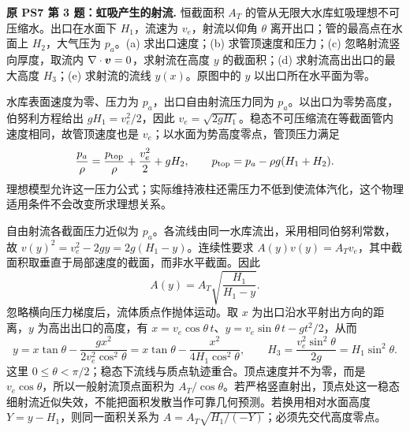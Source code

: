 \begin{example}
\textbf{原 PS7 第 3 题：虹吸产生的射流.} 
恒截面积 $A_T$ 的管从无限大水库虹吸理想不可压缩水。出口在水面下 $H_1$，流速为 $v_e$，射流以仰角 $\theta$ 离开出口；管的最高点在水面上 $H_2$，大气压为 $p_a$。(a) 求出口速度；(b) 求管顶速度和压力；(c) 忽略射流竖向厚度，取流内 $\nabla\cdot\boldsymbol{v}=0$，求射流在高度 $y$ 的截面积；(d) 求射流高出出口的最大高度 $H_3$；(e) 求射流的流线 $y(x)$。原图中的 $y$ 以出口所在水平面为零。
\end{example}
\begin{solution}
水库表面速度为零、压力为 $p_a$，出口自由射流压力同为 $p_a$。以出口为零势高度，伯努利方程给出 $gH_1=v_e^2/2$，因此 $v_e=\sqrt{2gH_1}$。稳态不可压缩流在等截面管内速度相同，故管顶速度也是 $v_e$；以水面为势高度零点，管顶压力满足
\[
 \frac{p_a}{\rho}=\frac{p_{\rm top}}{\rho}+\frac{v_e^2}{2}+gH_2,
 \qquad p_{\rm top}=p_a-\rho g(H_1+H_2).
\]
理想模型允许这一压力公式；实际维持液柱还需压力不低到使流体汽化，这个物理适用条件不会改变所求理想关系。

自由射流各截面压力近似为 $p_a$。各流线由同一水库流出，采用相同伯努利常数，故 $v(y)^2=v_e^2-2gy=2g(H_1-y)$。连续性要求 $A(y)v(y)=A_Tv_e$，其中截面积取垂直于局部速度的截面，而非水平截面。因此
\[
 A(y)=A_T\sqrt{\frac{H_1}{H_1-y}}.
\]
忽略横向压力梯度后，流体质点作抛体运动。取 $x$ 为出口沿水平射出方向的距离，$y$ 为高出出口的高度，有 $x=v_e\cos\theta\,t$、$y=v_e\sin\theta\,t-gt^2/2$，从而
\[
 y=x\tan\theta-\frac{gx^2}{2v_e^2\cos^2\theta}
 =x\tan\theta-\frac{x^2}{4H_1\cos^2\theta},\qquad
 H_3=\frac{v_e^2\sin^2\theta}{2g}=H_1\sin^2\theta.
\]
这里 $0\le\theta<\pi/2$；稳态下流线与质点轨迹重合。顶点速度并不为零，而是 $v_e\cos\theta$，所以一般射流顶点面积为 $A_T/\cos\theta$。若严格竖直射出，顶点处这一稳态细射流近似失效，不能把面积发散当作可靠几何预测。若换用相对水面高度 $Y=y-H_1$，则同一面积关系为 $A=A_T\sqrt{H_1/(-Y)}$；必须先交代高度零点。
\end{solution}

